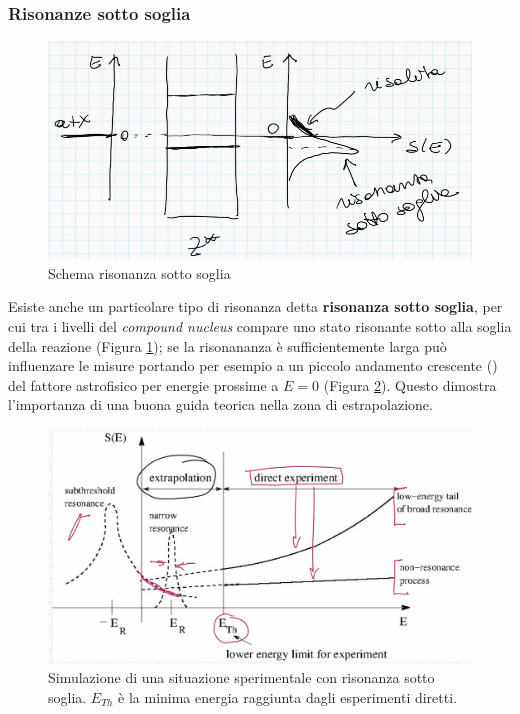 \subsubsection{Risonanze sotto soglia}
\begin{figure}[h]
    \centering
    \includegraphics[scale=0.8]{Immagini/0325_risonanza4.1.png}
    \caption{Schema risonanza sotto soglia}
    \label{0325_ris41}
\end{figure}
\noindent Esiste anche un particolare tipo di risonanza detta \textbf{risonanza sotto soglia}, per cui tra i livelli del \textit{compound nucleus} compare uno stato risonante sotto alla soglia della reazione (Figura \ref{0325_ris41}); se la risonananza è sufficientemente larga può influenzare le misure portando per esempio a un piccolo andamento crescente () del fattore astrofisico per energie prossime a $E=0$ (Figura \ref{0325_ris4}). Questo dimostra l'importanza di una buona guida teorica nella zona di estrapolazione.

\begin{figure}[h]
    \centering
    \includegraphics[scale=0.3]{Immagini/0325_risonanza4.png}
    \caption{Simulazione di una situazione sperimentale con risonanza sotto soglia. $E_{Th}$ è la minima energia raggiunta dagli esperimenti diretti.}
    \label{0325_ris4}
\end{figure}
\newpage
